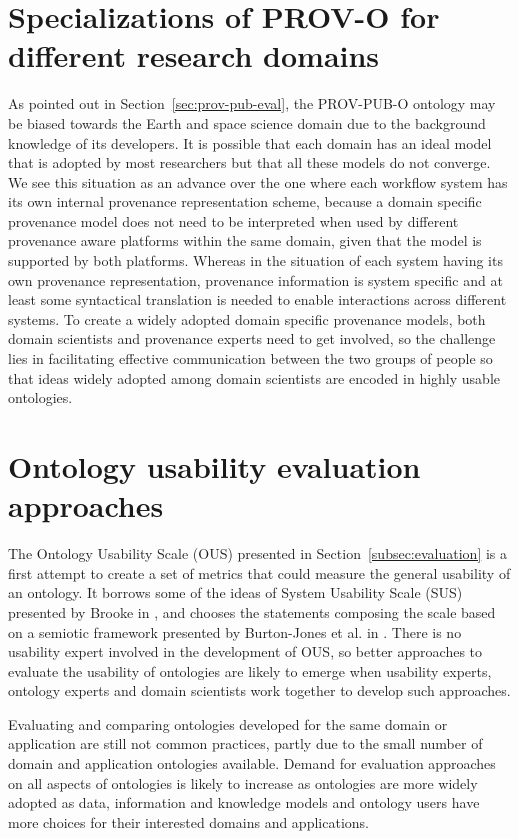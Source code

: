 \section{Specializations of PROV-O for different research domains}
As pointed out in Section~\ref{sec:prov-pub-eval}, the PROV-PUB-O ontology may be biased towards the Earth and space science domain due to the background knowledge of its developers. It is possible that each domain has an ideal model that is adopted by most researchers but that all these models do not converge. We see this situation as an advance over the one where each workflow system has its own internal provenance representation scheme, because a domain specific provenance model does not need to be interpreted when used by different provenance aware platforms within the same domain, given that the model is supported by both platforms. Whereas in the situation of each system having its own provenance representation, provenance information is system specific and at least some syntactical translation is needed to enable interactions across different systems. To create a widely adopted domain specific provenance models, both domain scientists and provenance experts need to get involved, so the challenge lies in facilitating effective communication between the two groups of people so that ideas widely adopted among domain scientists are encoded in highly usable ontologies.

\section{Ontology usability evaluation approaches}
The Ontology Usability Scale (OUS) presented in Section~\ref{subsec:evaluation} is a first attempt to create a set of metrics that could measure the general usability of an ontology. It borrows some of the ideas of System Usability Scale (SUS) presented by Brooke in \cite{brooke1996sus}, and chooses the statements composing the scale based on a semiotic framework presented by Burton-Jones et al. in \cite{burton2005semiotic}. There is no usability expert involved in the development of OUS, so better approaches to evaluate the usability of ontologies are likely to emerge when usability experts, ontology experts and domain scientists work together to develop such approaches.

Evaluating and comparing ontologies developed for the same domain or application are still not common practices, partly due to the small number of domain and application ontologies available. Demand for evaluation approaches on all aspects of ontologies is likely to increase as ontologies are more widely adopted as data, information and knowledge models and ontology users have more choices for their interested domains and applications.

